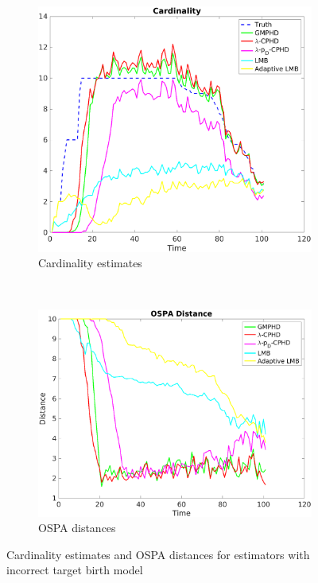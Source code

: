 \documentclass{article}
\begin{document}
\begin{figure}[H]
  \centering
  \begin{subfigure}[t]{0.49\textwidth}
    \centering
    \includegraphics[width=1\linewidth]{bad_birth/cardinality.png}
    \caption{Cardinality estimates}
  \end{subfigure}%
  ~ 
  \begin{subfigure}[t]{0.49\textwidth}
    \centering
    \includegraphics[width=1\linewidth]{bad_birth/ospa.png}
    \caption{OSPA distances}
  \end{subfigure}
\caption{Cardinality estimates and OSPA distances for estimators with incorrect target birth model}
\end{figure}
\end{document}
